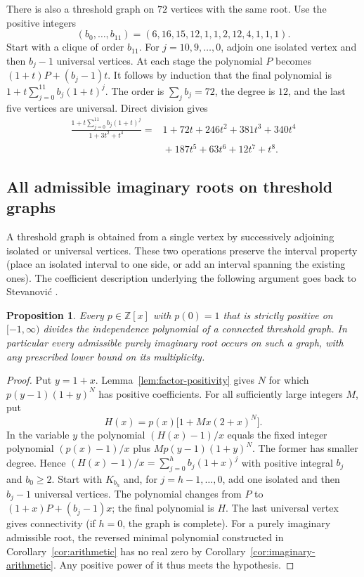 \documentclass[11pt,a4paper]{article}
\newtheorem{proposition}[theorem]{Proposition}
\begin{document}
There is also a threshold graph on $72$ vertices with the same root.
Use the positive integers
\[
(b_0,\ldots,b_{11})=(6,16,15,12,1,1,2,12,4,1,1,1).
\]
Start with a clique of order $b_{11}$. For $j=10,9,\ldots,0$,
adjoin one isolated vertex and then $b_j-1$ universal vertices.
At each stage the polynomial $P$ becomes
$(1+t)P+(b_j-1)t$. It follows by induction that the final polynomial
is $1+t\sum_{j=0}^{11} b_j(1+t)^j$. The order is $\sum_j b_j=72$,
the degree is $12$, and the last five vertices are universal. Direct
division gives
\begin{align*}
\frac{1+t\sum_{j=0}^{11}b_j(1+t)^j}{1+3t^2+t^4}
={}&1+72t+246t^2+381t^3+340t^4\\
 &{}+187t^5+63t^6+12t^7+t^8.
\end{align*}

\subsection{All admissible imaginary roots on threshold graphs}
A threshold graph is obtained from a single vertex by successively adjoining isolated or universal vertices. These two operations preserve the interval property (place an isolated interval to one side, or add an interval spanning the existing ones). The coefficient description underlying the following argument goes back to Stevanovi\'c \cite{stevanovic}.
\begin{proposition}\label{prop:threshold}
Every $p\in\mathbb Z[x]$ with $p(0)=1$ that is strictly positive on $[-1,\infty)$ divides the independence polynomial of a connected threshold graph. In particular every admissible purely imaginary root occurs on such a graph, with any prescribed lower bound on its multiplicity.
\end{proposition}
\begin{proof}
Put $y=1+x$. Lemma~\ref{lem:factor-positivity} gives $N$ for which $p(y-1)(1+y)^N$ has positive coefficients. For all sufficiently large integers $M$, put
\[
 H(x)=p(x)\bigl[1+Mx(2+x)^N\bigr].
\]
In the variable $y$ the polynomial $(H(x)-1)/x$ equals the fixed integer polynomial $(p(x)-1)/x$ plus $M p(y-1)(1+y)^N$. The former has smaller degree. Hence $(H(x)-1)/x=\sum_{j=0}^{h}b_j(1+x)^j$ with positive integral $b_j$ and $b_0\ge2$. Start with $K_{b_h}$ and, for $j=h-1,\ldots,0$, add one isolated and then $b_j-1$ universal vertices. The polynomial changes from $P$ to $(1+x)P+(b_j-1)x$; the final polynomial is $H$. The last universal vertex gives connectivity (if $h=0$, the graph is complete). For a purely imaginary admissible root, the reversed minimal polynomial constructed in Corollary~\ref{cor:arithmetic} has no real zero by Corollary~\ref{cor:imaginary-arithmetic}. Any positive power of it thus meets the hypothesis.
\end{proof}
\end{document}
